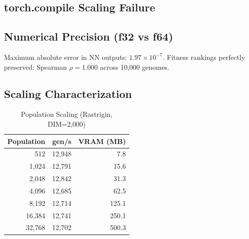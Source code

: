 \documentclass[sigconf,nonacm]{acmart}
\begin{document}
\subsection{torch.compile Scaling Failure}

\begin{table}[h]
\caption{\texttt{torch.compile} scaling (POP=10,000)}
\label{tab:compile}
\end{table}

\subsection{Numerical Precision (f32 vs f64)}

Maximum absolute error in NN outputs: $1.97 \times 10^{-7}$. Fitness rankings perfectly preserved: Spearman $\rho = 1.000$ across 10,000 genomes.

\subsection{Scaling Characterization}

\begin{table}[h]
\caption{Population Scaling (Rastrigin, DIM=2,000)}
\label{tab:popscale}
\begin{tabular}{rrr}
\toprule
Population & gen/s & VRAM (MB) \\
\midrule
512 & 12,948 & 7.8 \\
1,024 & 12,791 & 15.6 \\
2,048 & 12,842 & 31.3 \\
4,096 & 12,685 & 62.5 \\
8,192 & 12,714 & 125.1 \\
16,384 & 12,741 & 250.1 \\
32,768 & 12,702 & 500.3 \\
\bottomrule
\end{tabular}
\end{table}
\end{document}
